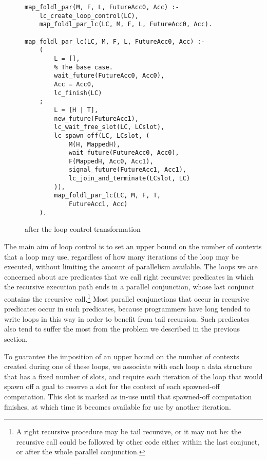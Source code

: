 \begin{figure}[tb]
\begin{verbatim}
map_foldl_par(M, F, L, FutureAcc0, Acc) :-
    lc_create_loop_control(LC),
    map_foldl_par_lc(LC, M, F, L, FutureAcc0, Acc).

map_foldl_par_lc(LC, M, F, L, FutureAcc0, Acc) :-
    (
        L = [],
        % The base case.
        wait_future(FutureAcc0, Acc0),
        Acc = Acc0,
        lc_finish(LC)
    ;
        L = [H | T],
        new_future(FutureAcc1),
        lc_wait_free_slot(LC, LCslot),
        lc_spawn_off(LC, LCslot, (
            M(H, MappedH),
            wait_future(FutureAcc0, Acc0),
            F(MappedH, Acc0, Acc1),
            signal_future(FutureAcc1, Acc1),
            lc_join_and_terminate(LCslot, LC)
        )),
        map_foldl_par_lc(LC, M, F, T,
            FutureAcc1, Acc)
    ).
\end{verbatim}
\caption{\mapfoldl{} after the loop control transformation}
\label{fig:map_foldl_transformed}
\end{figure}

The main aim of loop control is to set an upper bound
on the number of contexts that a loop may use,
regardless of how many iterations of the loop may be executed,
without limiting the amount of parallelism available.
The loops we are concerned about
are predicates that we call right recursive:
predicates in which the recursive execution path
ends in a parallel conjunction,
whose last conjunct contains the recursive call.\footnote{
A right recursive procedure may be tail recursive, or it may not be:
the recursive call could be followed by other code
either within the last conjunct, or after the whole parallel conjunction.}
Most parallel conjunctions that occur in recursive predicates
occur in such predicates,
because programmers have long tended to write loops in this way
in order to benefit from tail recursion.
Such predicates also tend to
suffer the most from the problem we described in the previous section.

To guarantee the imposition of an upper bound
on the number of contexts created during one of these loops,
we associate with each loop a data structure
that has a fixed number of slots,
and require each iteration of the loop that would spawn off a goal
to reserve a slot for the context of each spawned-off computation.
This slot is marked as in-use until that spawned-off computation finishes,
at which time it becomes available for use by another iteration.

